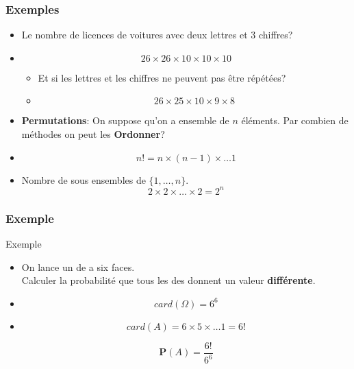 \documentclass{beamer}
\begin{document}
\begin{frame}[t]
  \frametitle{Exemples}
  \begin{itemize}
    \small
    \item  Le nombre de licences de voitures avec deux lettres et 3 chiffres?
    \item<2-> 
      \begin{equation*}
        26\times 26 \times 10 \times 10 \times 10
      \end{equation*}
      \begin{itemize}
        \item<3-> Et si les lettres et les chiffres ne peuvent pas être répétées?
        \item<4->
          \begin{equation*}
            26 \times 25 \times 10 \times 9 \times 8
          \end{equation*}
      \end{itemize}
    \item<5-> \alert{\textbf{Permutations}}: On suppose qu'on a ensemble de $n$
      éléments. Par combien de méthodes on peut les \textbf{Ordonner}?
    \item<6->
      \begin{equation*}
        n! = n\times(n-1)\times \ldots 1
      \end{equation*}

    \item<7-> \alert{Nombre de sous ensembles} de $\{1,\ldots, n\}$.
      \begin{equation*}
        2\times 2 \times \ldots \times 2 = 2^n 
      \end{equation*}
  \end{itemize}
\end{frame}
  
\begin{frame}[t]
\frametitle{Exemple}
 \begin{block}{Exemple}
   \scriptsize
\begin{itemize}
  \item On lance un de a six faces.\\[4pt]
    Calculer la probabilité que tous les des donnent un valeur
    \alert{\textbf{différente}}.\\[4pt]
\end{itemize}
 \end{block} 
 \pause
 \begin{itemize}
   \item 
     $$
     card(\Omega) = 6^6
     $$
 \end{itemize}

 
 \pause

 \begin{itemize}
   \item
     $$
     card(A) = 6\times 5 \times\ldots 1 = 6!
     $$
     \pause

     $$
     \mathbf{P}(A) = \dfrac{6!}{6^6}
     $$
 \end{itemize}
\end{frame}
\end{document}
